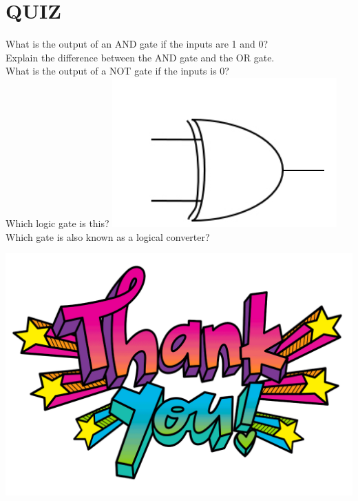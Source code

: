 \documentclass{article}
\begin{document}
\section{QUIZ}
What is the output of an AND gate if the inputs are 1 and 0?
\\
Explain the difference between the AND gate and the OR gate.\\
What is the output of a NOT gate if the inputs is 0?\\
Which logic gate is this?
\includegraphics[width=0.1\linewidth]{12}\\
Which gate is also known as a logical converter?
\\
\newpage


\newpage
\includegraphics[width=1.0\linewidth]{thanks}
\end{document}
